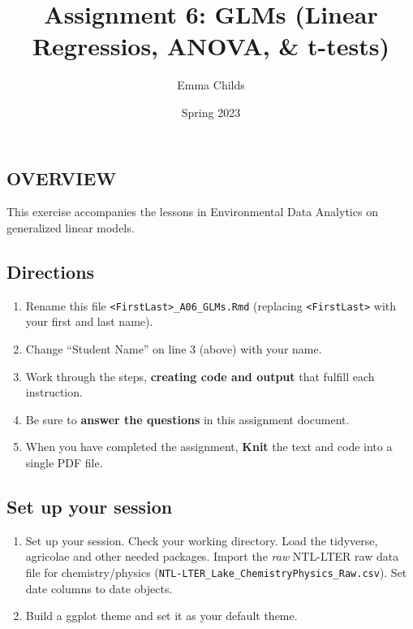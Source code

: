 \documentclass[
]{article}
\title{Assignment 6: GLMs (Linear Regressios, ANOVA, \& t-tests)}
\author{Emma Childs}
\date{Spring 2023}
\providecommand{\tightlist}{%
  \setlength{\itemsep}{0pt}\setlength{\parskip}{0pt}}
\begin{document}
\maketitle

\hypertarget{overview}{%
\subsection{OVERVIEW}\label{overview}}

This exercise accompanies the lessons in Environmental Data Analytics on
generalized linear models.

\hypertarget{directions}{%
\subsection{Directions}\label{directions}}

\begin{enumerate}
\def\labelenumi{\arabic{enumi}.}
\tightlist
\item
  Rename this file
  \texttt{\textless{}FirstLast\textgreater{}\_A06\_GLMs.Rmd} (replacing
  \texttt{\textless{}FirstLast\textgreater{}} with your first and last
  name).
\item
  Change ``Student Name'' on line 3 (above) with your name.
\item
  Work through the steps, \textbf{creating code and output} that fulfill
  each instruction.
\item
  Be sure to \textbf{answer the questions} in this assignment document.
\item
  When you have completed the assignment, \textbf{Knit} the text and
  code into a single PDF file.
\end{enumerate}

\hypertarget{set-up-your-session}{%
\subsection{Set up your session}\label{set-up-your-session}}

\begin{enumerate}
\def\labelenumi{\arabic{enumi}.}
\item
  Set up your session. Check your working directory. Load the tidyverse,
  agricolae and other needed packages. Import the \emph{raw} NTL-LTER
  raw data file for chemistry/physics
  (\texttt{NTL-LTER\_Lake\_ChemistryPhysics\_Raw.csv}). Set date columns
  to date objects.
\item
  Build a ggplot theme and set it as your default theme.
\end{enumerate}
\end{document}
